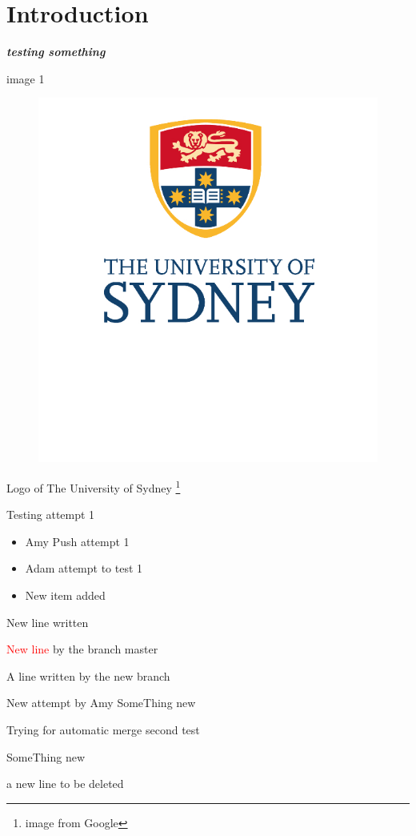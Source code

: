 \documentclass[10pt]{article}
\newcommand{\boldit}[1]{\textbf{\textit{#1}}}
\begin{document}
\section{\textsf{Introduction}}
\boldit{testing something}

image 1 
\begin{figure}[hbt!]
  \centering
  \includegraphics{usyd}
\end{figure}

Logo of The University of Sydney \footnote{image from Google}

Testing attempt 1
\begin{itemize}
  \item Amy Push attempt 1
  \item Adam attempt to test 1
  \item New item added
\end{itemize}
New line written

\textcolor{red}{New line} by the branch master


A line written by the new branch

New attempt by Amy
SomeThing new

Trying for automatic merge
second test



SomeThing new


a new line to be deleted
\end{document}
